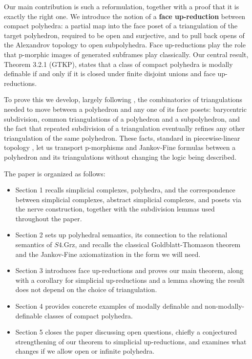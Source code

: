 Our main contribution is such a reformulation, 
together with a proof that it is exactly the right one. 
We introduce the notion of a \textbf{face up-reduction} 
between compact polyhedra: 
a partial map into the face poset of a triangulation of the target polyhedron, 
required to be open and surjective, 
and to pull back opens of the Alexandrov topology to open subpolyhedra. 
Face up-reductions play the role that p-morphic images 
of generated subframes play classically. Our central result, Theorem 3.2.1 (GTKP), 
states that a class of compact polyhedra is modally definable 
if and only if it is closed under finite disjoint unions and 
face up-reductions.

To prove this we develop, largely following \cite{Dekker}, 
the combinatorics of triangulations needed to move between 
a polyhedron and any one of its face posets: 
barycentric subdivision, common triangulations of 
a polyhedron and a subpolyhedron, 
and the fact that repeated subdivision of a triangulation 
eventually refines any other triangulation of the same polyhedron. 
These facts, standard in piecewise-linear topology \cite{PLTopology}, 
let us transport p-morphisms and Jankov-Fine formulas 
between a polyhedron and its triangulations without changing 
the logic being described.

The paper is organized as follows:
\begin{itemize}
    \item Section 1 recalls simplicial complexes, polyhedra, 
and the correspondence between simplicial complexes, 
abstract simplicial complexes, and posets via the nerve construction, 
together with the subdivision lemmas used throughout the paper. 
    \item Section 2 sets up polyhedral semantics, 
its connection to the relational semantics of $S4.\text{Grz}$,
and recalls the classical Goldblatt-Thomason theorem and 
the Jankov-Fine axiomatization in the form we will need.
    \item Section 3 introduces face up-reductions and proves our main theorem, 
along with a corollary for simplicial up-reductions and 
a lemma showing the result does not depend on the choice of triangulation. 
    \item Section 4 provides concrete examples of modally definable 
and non-modally-definable classes of compact polyhedra.
    \item Section 5 closes the paper discussing open questions, 
chiefly a conjectured strengthening of our theorem 
to simplicial up-reductions, 
and examines what changes if we allow open or infinite polyhedra. 
\end{itemize}

 




